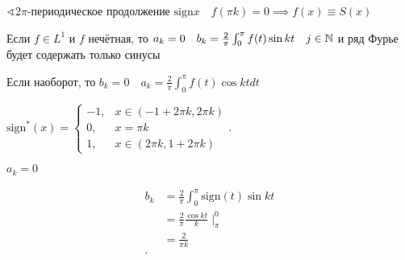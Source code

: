 \begin{example}
    $\sphericalangle 2\pi$-периодическое продолжение  $\mathrm{sign} x\quad f(\pi k) = 0 \implies f(x) \equiv S(x)$
\end{example}

\begin{note}
    Если $f\in L^1$ и $f$ нечётная, то $a_k = 0\quad b_k = \frac{2}{\pi}\int_0^\pi f(t)\sin kt\quad j\in \mathbb{N} $ и ряд Фурье будет содержать только синусы

    Если наоборот, то $b_k = 0\quad a_k = \frac{2}{\pi} \int_0^\pi f(t)\cos kt dt$
\end{note}

\begin{example}
    $\mathrm{sign}^* (x) = \begin{cases}
        -1, & x \in (-1 + 2\pi k, 2\pi k)\\
        0, & x = \pi k\\
        1, & x \in (2\pi k, 1 + 2\pi k)
    \end{cases}.$

    $a_k = 0$

    \begin{align*}
        b_k &= \frac{2}{\pi} \int_0^\pi \mathrm{sign}(t)\sin kt \\
        &= \frac{2}{\pi} \frac{\cos kt }{k}\mid _{\pi}^0 \\
        &= \frac{2}{\pi k} \\
    .\end{align*}
\end{example}




